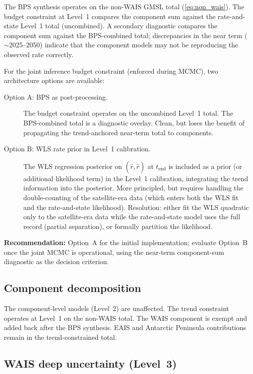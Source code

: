 \documentclass[11pt]{article}
\newcommand{\tend}{t_{\mathrm{end}}}
\begin{document}
The BPS synthesis operates on the non-WAIS GMSL total (\cref{eq:non_wais}).  The budget constraint at Level~1 compares the component sum against the rate-and-state Level~1 total (uncombined).  A secondary diagnostic compares the component sum against the BPS-combined total; discrepancies in the near term ($\sim$2025--2050) indicate that the component models may not be reproducing the observed rate correctly.

For the joint inference budget constraint (enforced during MCMC), two architecture options are available:
\begin{description}
  \item[Option A: BPS as post-processing.]  The budget constraint operates on the uncombined Level~1 total.  The BPS-combined total is a diagnostic overlay.  Clean, but loses the benefit of propagating the trend-anchored near-term total to components.
  \item[Option B: WLS rate prior in Level~1 calibration.]  The WLS regression posterior on $(\hat{r}, \dot{\hat{r}})$ at $\tend$ is included as a prior (or additional likelihood term) in the Level~1 calibration, integrating the trend information into the posterior.  More principled, but requires handling the double-counting of the satellite-era data (which enters both the WLS fit and the rate-and-state likelihood).  Resolution: either fit the WLS quadratic only to the satellite-era data while the rate-and-state model uses the full record (partial separation), or formally partition the likelihood.
\end{description}

\textbf{Recommendation:} Option~A for the initial implementation; evaluate Option~B once the joint MCMC is operational, using the near-term component-sum diagnostic as the decision criterion.

\subsection{Component decomposition}

The component-level models (Level~2) are unaffected.  The trend constraint operates at Level~1 on the non-WAIS total.  The WAIS component is exempt and added back after the BPS synthesis.  EAIS and Antarctic Peninsula contributions remain in the trend-constrained total.

\subsection{WAIS deep uncertainty (Level~3)}
\end{document}
